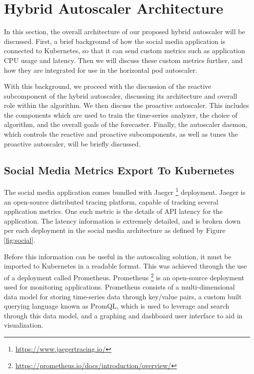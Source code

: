 \section{Hybrid Autoscaler Architecture}
\label{ref:hybrid-auto-arch}


In this section, the overall architecture of our proposed hybrid autoscaler will be discussed. First, a brief background of how the social media application is connected to Kubernetes, so that it can send custom metrics such as application CPU usage and latency. Then we will discuss these custom metrics further, and how they are integrated for use in the horizontal pod autoscaler.\par

With this background, we proceed with the discussion of the reactive subcomponent of the hybrid autoscaler, discussing its architecture and overall role within the algorithm. We then discuss the proactive autoscaler. This includes the components which are used to train the time-series analyzer, the choice of algorithm, and the overall goals of the forecaster. Finally, the autoscaler daemon, which controls the reactive and proactive subcomponents, as well as tunes the proactive autoscaler, will be briefly discussed.\par

\subsection{Social Media Metrics Export To Kubernetes}
\label{subsec:metrics-export}

The social media application comes bundled with Jaeger \footnote{\url{https://www.jaegertracing.io/}} deployment. Jaeger is an open-source distributed tracing platform, capable of tracking several application metrics. One such metric is the details of API latency for the application. The latency information is extremely detailed, and is broken down per each deployment in the social media architecture as defined by Figure \ref{fig:social}.\par

Before this information can be useful in the autoscaling solution, it must be imported to Kubernetes in a readable format. This was achieved through the use of a deployment called Prometheus. Prometheus \footnote{\url{https://prometheus.io/docs/introduction/overview/}} is an open-source deployment used for monitoring applications. Prometheus consists of a multi-dimensional data model for storing time-series data through key/value pairs, a custom built querying language known as PromQL, which is used to leverage and search through this data model, and a graphing and dashboard user interface to aid in visualization.\par

